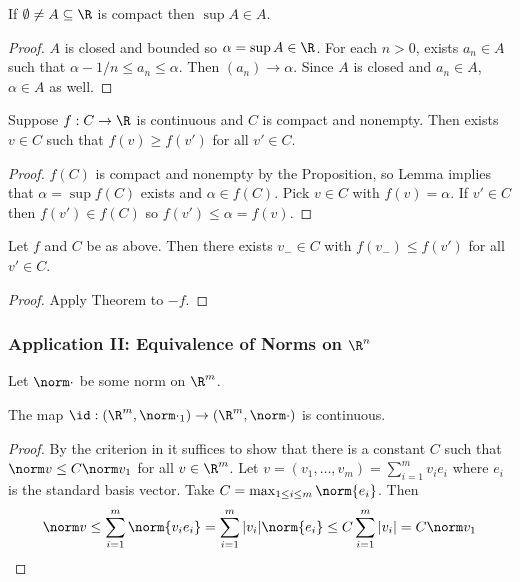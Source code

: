 \documentclass[a4paper]{article}
\theoremstyle{definition}
\begin{document}
\begin{lemma}
  If \(\emptyset \neq A \subseteq \R \) is compact then \(\sup A \in A\).
\end{lemma}

\begin{proof}
  \(A\) is closed and bounded so \(\alpha = \sup A\in \R\). For each \(n>0\), exists \(a_n \in A\) such that \(\alpha-1/n \leq a_n \leq \alpha\). Then \((a_n)\to \alpha\). Since \(A\) is closed and \(a_n \in A\), \(\alpha\in A\) as well.
\end{proof}
 
\begin{theorem}
  Suppose \(f:C\to \R\)  is continuous and \(C\) is compact and nonempty. Then exists \(v\in C\) such that \(f(v) \geq f(v')\) for all \(v' \in C\).
\end{theorem}

\begin{proof}
  \(f(C)\) is compact and nonempty by the Proposition, so Lemma implies that \(\alpha = \sup f(C)\) exists and \(\alpha\in f(C)\). Pick \(v\in C\) with \(f(v) = \alpha\). If \(v'\in C\) then \(f(v') \in f(C)\) so \(f(v') \leq \alpha = f(v)\).
\end{proof}

\begin{corollary}
  Let \(f\) and \(C\) be as above. Then there exists \(v_-\in C\) with \(f(v_-) \leq f(v')\) for all \(v' \in C\).
\end{corollary}

\begin{proof}
  Apply Theorem to \(-f\).
\end{proof}

\subsubsection{Application II: Equivalence of Norms on \texorpdfstring{\(\R^n\)}{ℝ\^{}n}}

Let \(\norm \cdot\) be some norm on \(\R^m\).
  
\begin{lemma}
  The map \(\id: (\R^m, \norm \cdot_1) \to (\R^m, \norm \cdot)\) is continuous.
\end{lemma}

\begin{proof}
  By the criterion in  it suffices to show that there is a constant \(C\) such that \(\norm v \leq C \norm v_1\) for all \(v\in \R^m\). Let \(v = (v_1,\dots,v_m) = \sum_{i=1}^{m}v_ie_i \) where \(e_i\) is the standard basis vector. Take \(C = \max_{1\leq i\leq m}\norm{e_i}\). Then
  \[
    \norm v \leq \sum_{i=1}^{m}\norm{v_ie_i} = \sum_{i=1}^{m}|v_i| \norm{e_i} \leq C \sum_{i=1}^{m}|v_i| = C \norm v_1
  \]
\end{proof}
\end{document}
